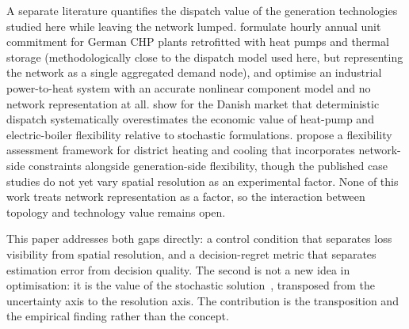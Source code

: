A separate literature quantifies the dispatch value of the generation technologies
studied here while leaving the network lumped. \citet{Mollenhauer2018} formulate hourly
annual unit commitment for German CHP plants retrofitted with heat pumps and thermal
storage (methodologically close to the dispatch model used here, but representing the
network as a single aggregated demand node), and \citet{Walden2023} optimise an
industrial power-to-heat system with an accurate nonlinear component model and no network
representation at all. \citet{Nielsen2016} show for the Danish market that deterministic
dispatch systematically overestimates the economic value of heat-pump and electric-boiler
flexibility relative to stochastic formulations. \citet{Riedl2026} propose a flexibility
assessment framework for district heating and cooling that incorporates network-side
constraints alongside generation-side flexibility, though the published case studies do
not yet vary spatial resolution as an experimental factor. None of this work treats
network representation as a factor, so the interaction between topology and technology
value remains open.

This paper addresses both gaps directly: a control condition that separates loss
visibility from spatial resolution, and a decision-regret metric that separates
estimation error from decision quality. The second is not a new idea in optimisation:
it is the value of the stochastic solution~\citep{BirgeLouveaux2011}, transposed from the
uncertainty axis to the resolution axis. The contribution is the transposition and the
empirical finding rather than the concept.
